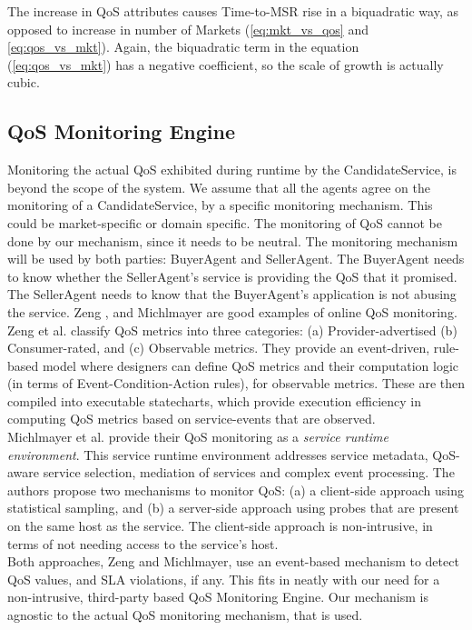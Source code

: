 \documentclass[10pt,journal,compsoc]{IEEEtran}
\begin{document}
The increase in QoS attributes causes Time-to-MSR rise in a biquadratic way, as opposed to increase in number of Markets (\autoref{eq:mkt_vs_qos} and \autoref{eq:qos_vs_mkt}). Again, the biquadratic term in the equation (\autoref{eq:qos_vs_mkt}) has a negative coefficient, so the scale of growth is actually cubic.\\

\subsection{QoS Monitoring Engine}
Monitoring the actual QoS exhibited during runtime by the CandidateService, is beyond the scope of the system. We assume that all the agents agree on the monitoring of a CandidateService, by a specific monitoring mechanism. This could be market-specific or domain specific. The monitoring of QoS cannot be done by our mechanism, since it needs to be neutral. The monitoring mechanism will be used by both parties: BuyerAgent and SellerAgent. The BuyerAgent needs to know whether the SellerAgent's service is providing the QoS that it promised. The SellerAgent needs to know that the BuyerAgent's application is not abusing the service. Zeng \cite{Zeng2007Monitoring}, and Michlmayer\cite{Michlmayr2009Comprehensive} are good examples of online QoS monitoring. Zeng et al. classify QoS metrics into three categories: (a) Provider-advertised (b) Consumer-rated, and (c) Observable metrics. They provide an event-driven, rule-based model where designers can define QoS metrics and their computation logic (in terms of Event-Condition-Action rules), for observable metrics. These are then compiled into executable statecharts, which provide execution efficiency in computing QoS metrics based on service-events that are observed. \\
Michlmayer et al. provide their QoS monitoring as a \textit{service runtime environment}. This service runtime environment addresses service metadata, QoS-aware service selection, mediation of services and complex event processing. The authors propose two mechanisms to monitor QoS: (a) a client-side approach using statistical sampling, and (b) a server-side approach using probes that are present on the same host as the service. The client-side approach is non-intrusive, in terms of not needing access to the service's host. \\
Both approaches, Zeng and Michlmayer, use an event-based mechanism to detect QoS values, and SLA violations, if any. This fits in neatly with our need for a non-intrusive, third-party based QoS Monitoring Engine. Our mechanism is agnostic to the actual QoS monitoring mechanism, that is used. 
\end{document}
